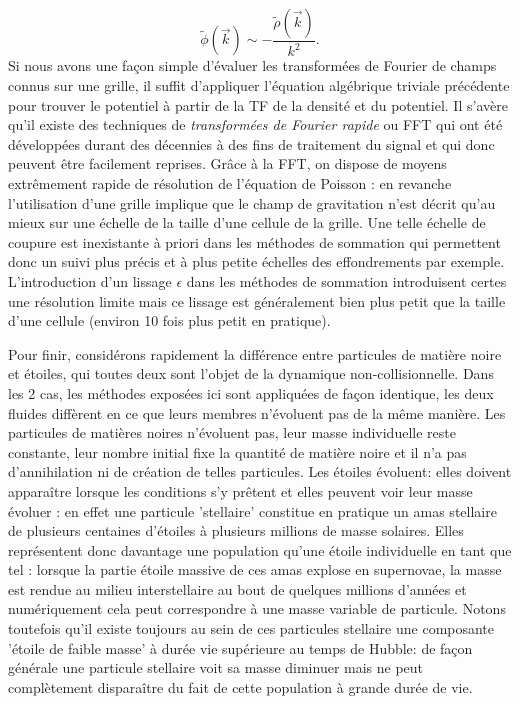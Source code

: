 \begin{equation}
\tilde \phi(\vec k)\sim -\frac{\tilde \rho(\vec k)}{k^2}.
\end{equation} 
Si nous avons une façon simple d'évaluer les transformées de Fourier de champs connus sur une grille, il suffit d'appliquer l'équation algébrique triviale précédente pour trouver le potentiel à partir de la TF de la densité et du potentiel. Il s'avère qu'il existe des techniques de \textit{transformées de Fourier rapide} ou FFT qui ont été développées durant des décennies à des fins de traitement du signal et qui donc peuvent être facilement reprises. Grâce à la FFT, on dispose de moyens extrêmement rapide de résolution de l'équation de Poisson : en revanche l'utilisation d'une grille implique que le champ de gravitation n'est décrit qu'au mieux sur une échelle de la taille d'une cellule de la grille. Une telle échelle de coupure est inexistante à priori dans les méthodes de sommation qui permettent donc un suivi plus précis et à plus petite échelles des effondrements par exemple. L'introduction d'un lissage $\epsilon$ dans les méthodes de sommation introduisent certes une résolution limite mais ce lissage est généralement bien plus petit que la taille d'une cellule (environ 10 fois plus petit en pratique).

Pour finir, considérons rapidement la différence entre particules de matière noire et étoiles, qui toutes deux sont l'objet de la dynamique non-collisionnelle. Dans les 2 cas, les méthodes exposées ici sont appliquées de façon identique, les deux fluides diffèrent en ce que leurs membres n'évoluent pas de la même manière. Les particules de matières noires n'évoluent pas, leur masse individuelle reste constante, leur nombre initial fixe la quantité de matière noire et il n'a pas d'annihilation ni de création de telles particules. Les étoiles évoluent: elles doivent apparaître lorsque les conditions s'y prêtent et elles peuvent voir leur masse évoluer : en effet une particule 'stellaire' constitue en pratique un amas stellaire  de plusieurs centaines d'étoiles à plusieurs millions de masse solaires. Elles représentent donc davantage une population qu'une étoile individuelle en tant que tel : lorsque la partie étoile massive de ces amas explose en supernovae, la masse est rendue au milieu interstellaire au bout de quelques millions d'années et numériquement cela peut correspondre à une masse variable de particule. Notons toutefois qu'il existe toujours au sein de ces particules stellaire une composante 'étoile de faible masse' à durée vie supérieure au temps de Hubble: de façon générale une particule stellaire voit sa masse diminuer mais ne peut complètement disparaître du fait de cette population à grande durée de vie.

